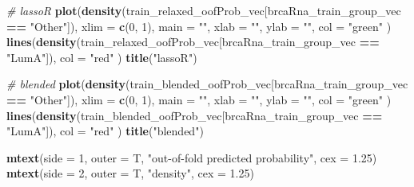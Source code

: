 \documentclass[
]{book}
\newenvironment{Shaded}{\begin{snugshade}}{\end{snugshade}}
\newcommand{\CommentTok}[1]{\textcolor[rgb]{0.56,0.35,0.01}{\textit{#1}}}
\newcommand{\DataTypeTok}[1]{\textcolor[rgb]{0.13,0.29,0.53}{#1}}
\newcommand{\DecValTok}[1]{\textcolor[rgb]{0.00,0.00,0.81}{#1}}
\newcommand{\FloatTok}[1]{\textcolor[rgb]{0.00,0.00,0.81}{#1}}
\newcommand{\KeywordTok}[1]{\textcolor[rgb]{0.13,0.29,0.53}{\textbf{#1}}}
\newcommand{\NormalTok}[1]{#1}
\newcommand{\OperatorTok}[1]{\textcolor[rgb]{0.81,0.36,0.00}{\textbf{#1}}}
\newcommand{\StringTok}[1]{\textcolor[rgb]{0.31,0.60,0.02}{#1}}
\begin{document}
\begin{Shaded}
\begin{Highlighting}[]
\CommentTok{\# lassoR}
\KeywordTok{plot}\NormalTok{(}\KeywordTok{density}\NormalTok{(train\_relaxed\_oofProb\_vec[brcaRna\_train\_group\_vec }\OperatorTok{==}\StringTok{ "Other"}\NormalTok{]),}
  \DataTypeTok{xlim =} \KeywordTok{c}\NormalTok{(}\DecValTok{0}\NormalTok{, }\DecValTok{1}\NormalTok{), }\DataTypeTok{main =} \StringTok{""}\NormalTok{, }\DataTypeTok{xlab =} \StringTok{""}\NormalTok{, }\DataTypeTok{ylab =} \StringTok{""}\NormalTok{, }\DataTypeTok{col =} \StringTok{"green"}
\NormalTok{)}
\KeywordTok{lines}\NormalTok{(}\KeywordTok{density}\NormalTok{(train\_relaxed\_oofProb\_vec[brcaRna\_train\_group\_vec }\OperatorTok{==}\StringTok{ "LumA"}\NormalTok{]),}
  \DataTypeTok{col =} \StringTok{"red"}
\NormalTok{)}
\KeywordTok{title}\NormalTok{(}\StringTok{"lassoR"}\NormalTok{)}

\CommentTok{\# blended}
\KeywordTok{plot}\NormalTok{(}\KeywordTok{density}\NormalTok{(train\_blended\_oofProb\_vec[brcaRna\_train\_group\_vec }\OperatorTok{==}\StringTok{ "Other"}\NormalTok{]),}
  \DataTypeTok{xlim =} \KeywordTok{c}\NormalTok{(}\DecValTok{0}\NormalTok{, }\DecValTok{1}\NormalTok{), }\DataTypeTok{main =} \StringTok{""}\NormalTok{, }\DataTypeTok{xlab =} \StringTok{""}\NormalTok{, }\DataTypeTok{ylab =} \StringTok{""}\NormalTok{, }\DataTypeTok{col =} \StringTok{"green"}
\NormalTok{)}
\KeywordTok{lines}\NormalTok{(}\KeywordTok{density}\NormalTok{(train\_blended\_oofProb\_vec[brcaRna\_train\_group\_vec }\OperatorTok{==}\StringTok{ "LumA"}\NormalTok{]),}
  \DataTypeTok{col =} \StringTok{"red"}
\NormalTok{)}
\KeywordTok{title}\NormalTok{(}\StringTok{"blended"}\NormalTok{)}

\KeywordTok{mtext}\NormalTok{(}\DataTypeTok{side =} \DecValTok{1}\NormalTok{, }\DataTypeTok{outer =}\NormalTok{ T, }\StringTok{"out{-}of{-}fold predicted probability"}\NormalTok{, }\DataTypeTok{cex =} \FloatTok{1.25}\NormalTok{)}
\KeywordTok{mtext}\NormalTok{(}\DataTypeTok{side =} \DecValTok{2}\NormalTok{, }\DataTypeTok{outer =}\NormalTok{ T, }\StringTok{"density"}\NormalTok{, }\DataTypeTok{cex =} \FloatTok{1.25}\NormalTok{)}
\end{Highlighting}
\end{Shaded}
\end{document}

